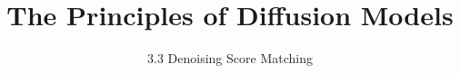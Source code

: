 
\title{The Principles of Diffusion Models}
\subtitle{3.3 Denoising Score Matching}


\begin{frame}
    \titlepage
\end{frame}


